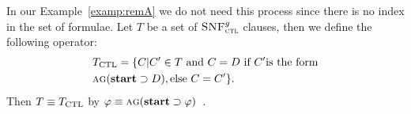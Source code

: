 \documentclass{article}
\begin{document}
In our Example~\ref{examp:remA} we do not need this process since there is no index in the set of formulae.
Let $T$ be a set of ${\textsc{SNF}_{\textsc{ctl}}^g}$ clauses, then we define the following operator:
\begin{align*}
&T_{\textrm{CTL}} = \{C|C'\in T\ \mbox{and}\ C = D \ \mbox{if}\ C' \mbox{is the form}\\
& \textsc{a}\textsc{g}(\textbf{start}\supset D), \mbox{else}\ C= C'\}.
\end{align*}
Then $T \equiv T_{\textrm{CTL}}$ by $\varphi \equiv \textsc{a} \textsc{g} (\textbf{start} \supset \varphi)$~\cite{bolotov2000clausal}.
\end{document}
